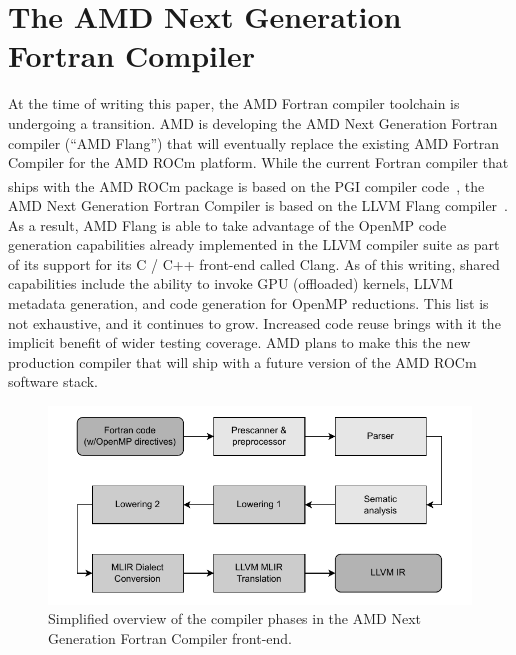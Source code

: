 \documentclass[acmtog,natbib=false]{acmart}
\newcommand{\registered}[0]{\textsuperscript{\textregistered}\xspace}
\newcommand{\trademark}[0]{\texttrademark\xspace}
\begin{document}

\section{The AMD Next Generation Fortran Compiler}
\label{sec:LLVMFlangCompiler}

At the time of writing this paper, the AMD Fortran compiler toolchain is undergoing a transition.
AMD is developing the AMD Next Generation Fortran compiler (``AMD Flang'') that will eventually replace the existing AMD Fortran Compiler for the AMD ROCm\trademark platform.
While the current Fortran compiler that ships with the AMD ROCm\trademark package is based on the PGI\registered compiler code~\cite{Lara17,Pric17}, the AMD Next Generation Fortran Compiler is based on the LLVM Flang compiler~\cite{LLVM25}.
As a result, AMD Flang is able to take advantage of the OpenMP code generation capabilities already implemented in the LLVM compiler suite as part of its support for its C / C++ front-end called Clang.
As of this writing, shared capabilities include the ability to invoke GPU (offloaded) kernels, LLVM metadata generation, and code generation for OpenMP reductions.
This list is not exhaustive, and it continues to grow. Increased code reuse brings with it the implicit benefit of wider testing coverage.
AMD plans to make this the new production compiler that will ship with a future version of the AMD ROCm\trademark software stack.

\begin{figure}[t]
\centering
\includegraphics[width=\linewidth]{figures/flang_compiler_phases_overview.pdf}
\caption{Simplified overview of the compiler phases in the AMD Next Generation Fortran Compiler front-end.\label{fig:FlangCompilerPhases}}
\end{figure}
\end{document}
